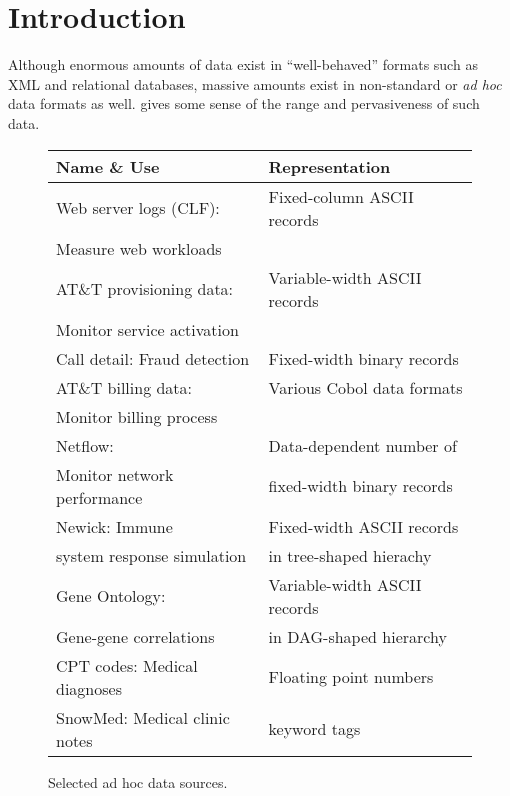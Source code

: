 \section{Introduction}
\label{section:intro}
Although enormous amounts of data exist in ``well-behaved'' formats such
as XML and relational databases, massive amounts exist in
non-standard or \textit{ad hoc} data formats as well. 
gives some sense of the range and pervasiveness of such data.
\begin{figure}
\begin{center}
\begin{tabular}{l|l}
\hline
Name \& Use   &  Representation               \\ \hline
Web server logs (CLF):  &  Fixed-column ASCII records \\ 
Measure web workloads &                             \\ \hline
AT\&T provisioning data: & Variable-width ASCII records  \\ 
Monitor service activation &                              \\ \hline
Call detail: Fraud detection  &  Fixed-width binary records \\  \hline 
AT\&T billing data: & Various Cobol data formats  \\ 
Monitor billing process   &                             \\ \hline
Netflow:                        & Data-dependent number of     \\ 
Monitor network performance  & fixed-width binary records  \\ \hline
Newick:   Immune                 & Fixed-width ASCII records \\ 
system response simulation & in tree-shaped hierachy\\ \hline                                
Gene Ontology:             & Variable-width ASCII records \\
Gene-gene correlations     & in DAG-shaped hierarchy \\ \hline
CPT codes: Medical diagnoses & Floating point numbers \\ \hline
SnowMed: Medical clinic notes & keyword tags  \\ 
\end{tabular}

\caption{Selected ad hoc data sources.}
\label{figure:data-sources}
\end{center}
\end{figure}
